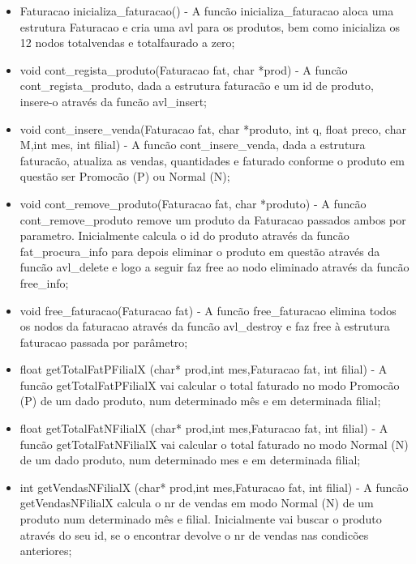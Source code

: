 \begin{itemize}

\item	Faturacao inicializa\_faturacao() - A funcão inicializa\_faturacao aloca uma estrutura Faturacao e cria uma avl para os produtos, bem como inicializa os 12 nodos totalvendas e totalfaurado a zero; 

\item	void cont\_regista\_produto(Faturacao fat, char *prod) - A funcão cont\_regista\_produto, dada a estrutura faturacão e um id de produto, insere-o através da funcão avl\_insert; 

\item	void cont\_insere\_venda(Faturacao fat, char *produto, int q, float preco, char M,int mes, int filial) - A funcão cont\_insere\_venda, dada a estrutura faturacão, atualiza as vendas, quantidades e faturado conforme o produto em questão ser Promocão (P) ou Normal (N); 

\item	void cont\_remove\_produto(Faturacao fat, char *produto) - A funcão cont\_remove\_produto remove um produto da Faturacao passados ambos por parametro. Inicialmente calcula o id do produto através da funcão fat\_procura\_info para depois eliminar o produto em questão através da funcão avl\_delete e logo a seguir faz free ao nodo eliminado através da funcão free\_info;

\item	void free\_faturacao(Faturacao fat) - A funcão free\_faturacao elimina todos os nodos da faturacao através da funcão avl\_destroy e faz free à estrutura faturacao passada por parâmetro;

\item	float getTotalFatPFilialX (char* prod,int mes,Faturacao fat, int filial) - A funcão getTotalFatPFilialX vai calcular o total faturado no modo Promocão (P) de um dado produto, num determinado mês e em determinada filial; 

\item	float getTotalFatNFilialX (char* prod,int mes,Faturacao fat, int filial) - A funcão getTotalFatNFilialX vai calcular o total faturado no modo Normal (N) de um dado produto, num determinado mes e em determinada filial;

\item	int getVendasNFilialX (char* prod,int mes,Faturacao fat, int filial) - A funcão getVendasNFilialX calcula o nr de vendas em modo Normal (N) de um produto num determinado mês e filial. Inicialmente vai buscar o produto através do seu id, se o encontrar devolve o nr de vendas nas condicões anteriores; 


\end{itemize}
